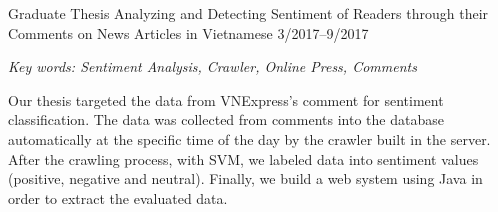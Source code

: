 

\begin{cventries}

  \cventry
    {Graduate Thesis} %
    {Analyzing and Detecting Sentiment of Readers through their Comments on News Articles in Vietnamese} %
    {} %
    {3/2017--9/2017} %
    {
      \begin{cvitems} %
        \item[] {\it Key words: Sentiment Analysis, Crawler, Online Press, Comments}
        \item[] {Our thesis targeted the data from VNExpress's comment for sentiment classification. The data was collected from comments into the database automatically at the specific time of the day by the crawler built in the server. After the crawling process, with SVM, we labeled data into sentiment values (positive, negative and neutral). Finally, we build a web system using Java in order to extract the evaluated data.}
      \end{cvitems}
    }

\end{cventries}

